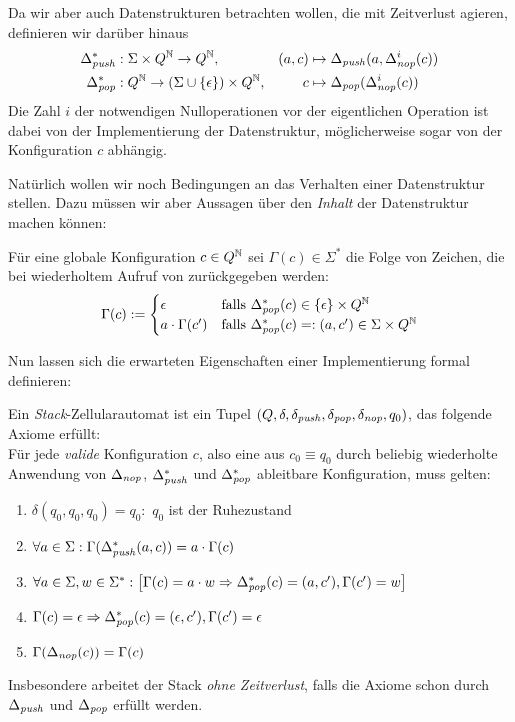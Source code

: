 \documentclass{article}
\begin{document}
Da wir aber auch Datenstrukturen betrachten wollen, die mit Zeitverlust agieren, definieren wir darüber hinaus
\begin{align*}
    \Delta^*_{\mathit{push}} &: \Sigma \times Q^{\mathbb{N}} \rightarrow Q^{\mathbb{N}},& (a,c) &\mapsto \Delta_{\mathit{push}}(a,\Delta^i_{\mathit{nop}}(c)) \\
    \Delta^*_{\mathit{pop}} &: Q^{\mathbb{N}} \rightarrow (\Sigma \cup \{\epsilon\}) \times Q^{\mathbb{N}},& c &\mapsto \Delta_{\mathit{pop}}(\Delta^i_{\mathit{nop}}(c))
\end{align*}
Die Zahl $i$ der notwendigen Nulloperationen vor der eigentlichen Operation ist dabei von der Implementierung der Datenstruktur, möglicherweise sogar von der Konfiguration $c$ abhängig.

Natürlich wollen wir noch Bedingungen an das Verhalten einer Datenstruktur stellen. Dazu müssen wir aber Aussagen über den \emph{Inhalt} der Datenstruktur machen können:
\begin{definition}
    Für eine globale Konfiguration $c \in Q^{\mathbb{N}}$ sei $\Gamma(c) \in \Sigma^*$ die Folge von Zeichen, die bei wiederholtem Aufruf von \pop zurückgegeben werden:
    \[ \Gamma(c) :=
        \begin{cases}
            \epsilon &\text{falls } \Delta^*_{\mathit{pop}}(c) \in \{\epsilon\} \times Q^{\mathbb{N}} \\
            a \cdot \Gamma(c') &\text{falls }\Delta^*_{\mathit{pop}}(c)=:(a,c') \in \Sigma \times Q^{\mathbb{N}}
    \end{cases} \]
\end{definition}

Nun lassen sich die erwarteten Eigenschaften einer Implementierung formal definieren:
\begin{definition}
    Ein \emph{Stack}-Zellularautomat ist ein Tupel $(Q, \delta, \delta_{\mathit{push}}, \delta_{\mathit{pop}}, \delta_{\mathit{nop}}, q_0)$, das folgende Axiome erfüllt: \\
    Für jede \emph{valide} Konfiguration $c$, also eine aus $c_0 \equiv q_0$ durch beliebig wiederholte Anwendung von $\Delta_\mathit{nop}$, $\Delta^*_\mathit{push}$ und $\Delta^*_\mathit{pop}$ ableitbare Konfiguration, muss gelten:
    \begin{enumerate}
        \item $\delta(q_0, q_0, q_0) = q_0$: $\,q_0$ ist der Ruhezustand
        \item $\forall a \in \Sigma: \Gamma(\Delta^*_{\mathit{push}}(a,c)) = a \cdot \Gamma(c)$
        \item $\forall a \in \Sigma, w \in \Sigma^*: \left[ \Gamma(c) = a \cdot w \Rightarrow \Delta^*_{\mathit{pop}}(c) = (a,c'), \Gamma(c') = w \right]$
        \item $\Gamma(c) = \epsilon \Rightarrow \Delta^*_{\mathit{pop}}(c) = (\epsilon,c'), \Gamma(c') = \epsilon$
        \item $\Gamma(\Delta_{\mathit{nop}}(c)) = \Gamma(c)$
    \end{enumerate}
    Insbesondere arbeitet der Stack \emph{ohne Zeitverlust}, falls die Axiome schon durch $\Delta_{\mathit{push}}$ und $\Delta_{\mathit{pop}}$ erfüllt werden.
\end{definition}
\end{document}

